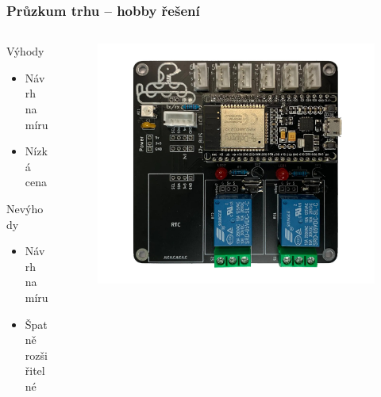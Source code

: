 \documentclass[%
  12pt,       				%
	t,                  %
	aspectratio=1610,   %
	unicode,						%
]{beamer}				    	%
\begin{document}
\begin{frame}[fragile]
\begin{columns}[T]
\begin{column}{0.5\textwidth}
\begin{figure}
			\end{figure}
		\end{column}
	\end{columns}											%
\end{frame}

\begin{frame}[fragile]
	\frametitle{Průzkum trhu -- hobby řešení}
	
	\begin{columns}[T] 								%
		\begin{column}{0.5\textwidth}		%
			\begin{block}{Výhody}
				\begin{itemize}
					\item Návrh na míru 
					\item Nízká cena
				\end{itemize}
			\end{block}
			\vspace{1.5ex}%
			\begin{alertblock}{Nevýhody}
				\begin{itemize}
					\item Návrh na míru
					\item Špatně rozšiřitelné
				\end{itemize}
			\end{alertblock}
		\end{column}
		\begin{column}{0.5\textwidth}		%
			\begin{figure}%
				\centering
				\vspace{-0.8cm}	              %
				\includegraphics[width=\columnwidth]{obrazky/prezentace/tera-cont.jpg}

\end{figure}
\end{column}
\end{columns}
\end{frame}
\end{document}
